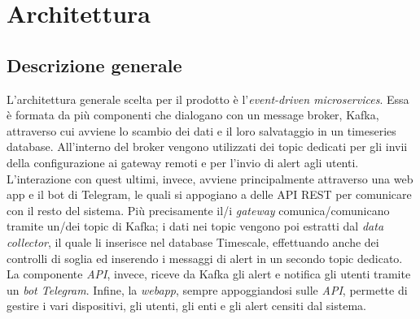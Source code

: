 \section{Architettura} 
	\subsection{Descrizione generale}
		L'architettura generale scelta per il prodotto è l'\textit{event-driven microservices}. 
		Essa è formata da più componenti che dialogano con un message broker, Kafka, attraverso cui avviene lo scambio dei dati e il loro salvataggio in un timeseries database.
		\newline
		All'interno del broker vengono utilizzati dei topic dedicati per gli invii della configurazione ai gateway remoti e per l'invio di alert agli utenti. 
		\newline
		L'interazione con quest ultimi, invece, avviene principalmente attraverso una web app e il bot di Telegram, le quali si appogiano a delle API REST per comunicare con il resto del sistema.
		\newline
		\newline
		Più precisamente il/i \textit{gateway} comunica/comunicano tramite un/dei topic di Kafka; i dati nei topic vengono poi estratti dal \textit{data collector}, il quale li inserisce nel database Timescale,  effettuando anche dei controlli di soglia ed inserendo i messaggi di alert in un secondo topic dedicato.
		\newline
		La componente \textit{API}, invece, riceve da Kafka gli alert e notifica gli utenti tramite un \textit{bot Telegram}.
		\newline
		Infine, la \textit{webapp}, sempre appoggiandosi sulle \textit{API}, permette di gestire i vari dispositivi, gli utenti, gli enti e gli alert censiti dal sistema.

